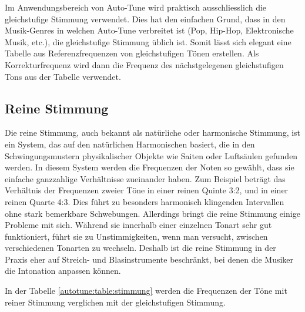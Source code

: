 Im Anwendungsbereich von Auto-Tune wird praktisch ausschliesslich die gleichstufige Stimmung verwendet.
Dies hat den einfachen Grund, dass in den Musik-Genres in welchen Auto-Tune verbreitet ist (Pop, Hip-Hop, Elektronische Musik, etc.), die gleichstufige Stimmung üblich ist.
Somit lässt sich elegant eine Tabelle aus Referenzfrequenzen von gleichstufigen Tönen erstellen.
Als Korrekturfrequenz wird dann die Frequenz des nächstgelegenen gleichstufigen Tons aus der Tabelle verwendet.


\subsection{Reine Stimmung
\label{autotune:subsection:reineStimmung}}
Die reine Stimmung, auch bekannt als natürliche oder harmonische Stimmung, ist ein System,
das auf den natürlichen Harmonischen basiert, die in den Schwingungsmustern physikalischer Objekte wie Saiten oder Luftsäulen gefunden werden.
In diesem System werden die Frequenzen der Noten so gewählt, dass sie einfache ganzzahlige Verhältnisse zueinander haben.
Zum Beispiel beträgt das Verhältnis der Frequenzen zweier Töne in einer reinen Quinte 3:2, und in einer reinen Quarte 4:3.
Dies führt zu besonders harmonisch klingenden Intervallen ohne stark bemerkbare Schwebungen.
Allerdings bringt die reine Stimmung einige Probleme mit sich.
Während sie innerhalb einer einzelnen Tonart sehr gut funktioniert, führt sie zu Unstimmigkeiten,
wenn man versucht, zwischen verschiedenen Tonarten zu wechseln.
Deshalb ist die reine Stimmung in der Praxis eher auf Streich- und Blasinstrumente beschränkt,
bei denen die Musiker die Intonation anpassen können.

In der Tabelle \ref{autotune:table:stimmung} werden die Frequenzen der Töne mit reiner Stimmung verglichen mit der gleichstufigen Stimmung.

